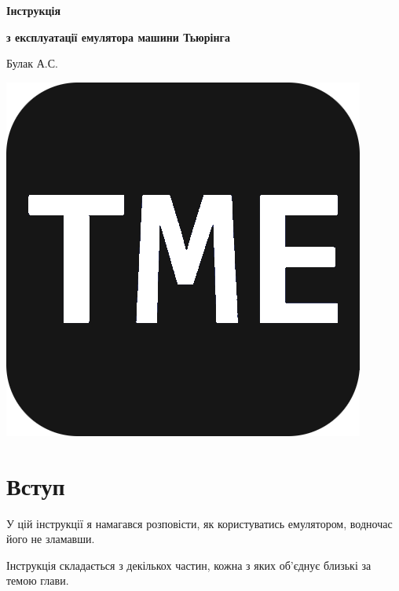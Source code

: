 \documentclass[oneside,final,14pt]{extreport}
\begin{document}
\begin{centering}

\thispagestyle{empty} %
\begin{minipage}[t]{16.75cm}
\vspace{10cm}
\centerline{\Huge  \bfseries Інструкція}
\centerline{\Large \bfseries з експлуатації емулятора машини Тьюрінга}

\vspace{10,4cm}

\centerline{Булак А.С.}
\vspace{0,2cm}
\begin{center}
\includegraphics[scale=0.1]{0}
\end{center}

\end{minipage}

\end{centering}


\pagebreak
	
\tableofcontents
\pagebreak
\setcounter{page}{2}
	
\chapter*{Вступ}
У цій інструкції я намагався розповісти, як користуватись емулятором, водночас його не зламавши.

Інструкція складається з декількох частин, кожна з яких об'єднує близькі за темою глави.
\end{document}
